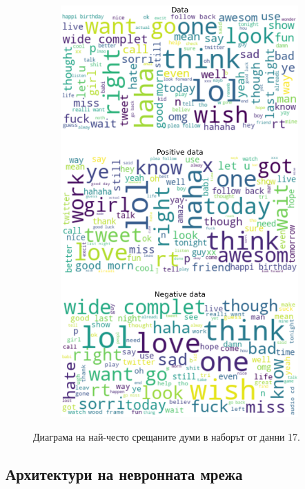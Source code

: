 \documentclass{article}
\begin{document}
\begin{itemize}
\begin{figure}[H]
\begin{subfigure}[b]{0.24\textwidth}
\includegraphics[width=\textwidth]{chapter-06/section-01-01/17/visualization/4/wordcloud.png}
\end{subfigure}
\caption{Диаграма на най-често срещаните думи в наборът от данни 17.}
\end{figure}

\end{itemize}

\subsection{Архитектури на невронната мрежа}
\end{document}
